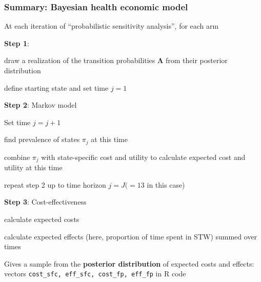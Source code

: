 \begin{frame}[fragile]

\frametitle{Summary: Bayesian health economic model}

At each iteration of ``probabilistic sensitivity analysis'', for each arm 

\bi
\item \noindent\textbf{Step 1}: 
\bi
\item draw a realization of the transition probabilities $\bm\Lambda$ from their posterior distribution 
\item define starting state and set time $j=1$
\ei

\vspace{5pt}\pause
\item \noindent\textbf{Step 2}: Markov model
\bi
\item Set time $j = j+1$
\item find prevalence of states $\pi_j$ at this time
\item combine $\pi_j$ with state-specific cost and utility to calculate expected cost and utility at this time
\item repeat step 2 up to time horizon $j = J(=13$ in this case) 
\ei

\vspace{5pt}\pause
\item \noindent\textbf{Step 3}: Cost-effectiveness
\bi
\item calculate expected \alert{costs} 
\item calculate expected \alert{effects} (here, proportion of time spent in STW)
  \ei
  summed over times
  \ei

  Gives a sample from the \textbf{posterior distribution} of expected costs and effects:
  vectors \verb+cost_sfc, eff_sfc, cost_fp, eff_fp+ in R code
\end{frame}



